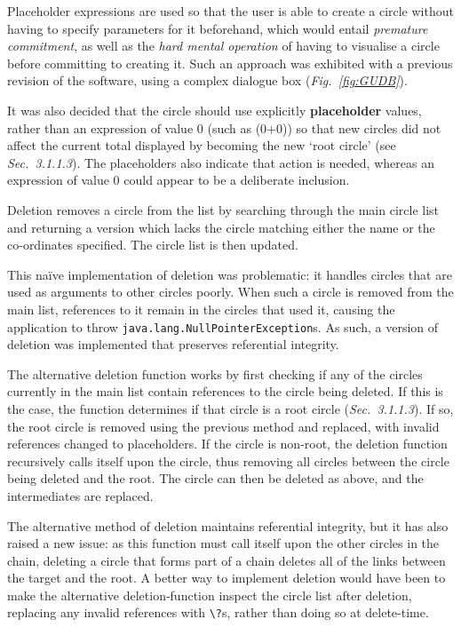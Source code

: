 \documentclass[12pt,twoside,notitlepage,xetex]{report}
\begin{document}
Placeholder expressions are used so that the user is able to create a circle without having to specify parameters for it beforehand, which would entail \emph{premature commitment}, as well as the \emph{hard mental operation} of having to visualise a circle before committing to creating it.  Such an approach was exhibited with a previous revision of the software, using a complex dialogue box (\emph{Fig.~\ref{fig:GUDB}}).

It was also decided that the circle should use explicitly {\bf placeholder} values, rather than an expression of value 0 (such as (0+0)) so that new circles did not affect the current total displayed by becoming the new `root circle' (see \emph{Sec.~3.1.1.3}).  The placeholders also indicate that action is needed, whereas an expression of value 0 could appear to be a deliberate inclusion.

Deletion removes a circle from the list by searching through the main circle list and returning a version which lacks the circle matching either the name or the co-ordinates specified.  The circle list is then updated.

This naïve implementation of deletion was problematic: it handles circles that are used as arguments to other circles poorly.  When such a circle is removed from the main list, references to it remain in the circles that used it, causing the application to throw \verb¬java.lang.NullPointerException¬s.  As such, a version of deletion was implemented that preserves referential integrity.

The alternative deletion function works by first checking if any of the circles currently in the main list contain references to the circle being deleted.  If this is the case, the function determines if that circle is a root circle (\emph{Sec.~3.1.1.3}).  If so, the root circle is removed using the previous method and replaced, with invalid references changed to placeholders.  If the circle is non-root, the deletion function recursively calls itself upon the circle, thus removing all circles between the circle being deleted and the root.  The circle can then be deleted as above, and the intermediates are replaced.

The alternative method of deletion maintains referential integrity, but it has also raised a new issue: as this function must call itself upon the other circles in the chain, deleting a circle that forms part of a chain deletes all of the links between the target and the root.  A better way to implement deletion would have been to make the alternative deletion-function inspect the circle list after deletion, replacing any invalid references with \verb¬\?¬s, rather than doing so at delete-time.
\end{document}
